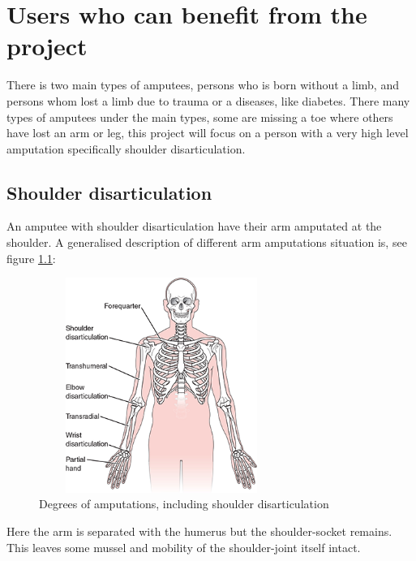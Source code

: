 \chapter{Users who can benefit from the project}\label{ch:End-User} 
There is two main types of amputees, persons who is born without a limb, and persons whom lost a limb due to trauma or a diseases, like diabetes\cite{StrainInjuries}. There many types of amputees under the main types, some are missing a toe where others have lost an arm or leg, this project will focus on a person with a very high level amputation specifically shoulder disarticulation.\\

\section{Shoulder disarticulation}
An amputee with shoulder disarticulation have their arm amputated at the shoulder. A generalised description of different arm amputations situation is, see figure \ref{fig:Degrees_of_amputations}:

\begin{figure}[H]
    \centering
    \includegraphics[width=8cm,height=7cm]{Figures/Contextual_figures/Degrees_of_amputation.png}
    \caption{Degrees of amputations, including shoulder disarticulation}
    \label{fig:Degrees_of_amputations}
\end{figure}
Here the arm is separated with the humerus but the shoulder-socket remains. This leaves some mussel and mobility of the shoulder-joint itself intact.  

